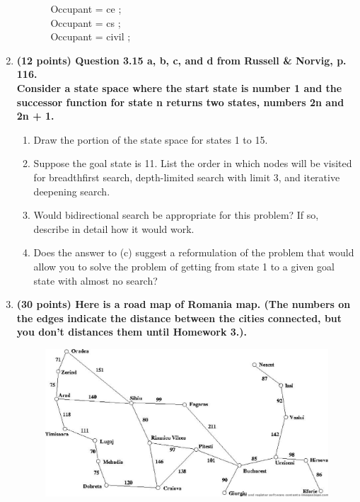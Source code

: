 \documentclass{article}%
\begin{document}
\begin{enumerate}
\begin{enumerate}
\begin{itemize}
		Occupant = ce ; \\

		Occupant = cs ; \\

		Occupant = civil ; 
		
		\end{itemize}

	\end{enumerate}



\item \textbf{(12 points) Question 3.15 a, b, c, and d from Russell \& Norvig, p. 116. \\
Consider a state space where the start state is number 1 and the successor function for
state n returns two states, numbers 2n and 2n + 1.}
	\begin{enumerate}
	\item Draw the portion of the state space for states 1 to 15.
	\item Suppose the goal state is 11. List the order in which nodes will be visited for breadthfirst
search, depth-limited search with limit 3, and iterative deepening search.
	\item Would bidirectional search be appropriate for this problem? If so, describe in detail
how it would work.
	\item Does the answer to (c) suggest a reformulation of the problem that would allow you to
solve the problem of getting from state 1 to a given goal state with almost no search?
\end{enumerate}
	
\item \textbf{(30 points) Here is a road map of Romania map. (The numbers on the edges indicate the distance between the cities connected, but you don't distances them until Homework 3.).}

\begin{figure}[h]
\centering
\includegraphics[scale=0.45, clip]{romania.eps} 
\vspace*{-2ex}
\end{figure}


\end{enumerate}
\end{document}
